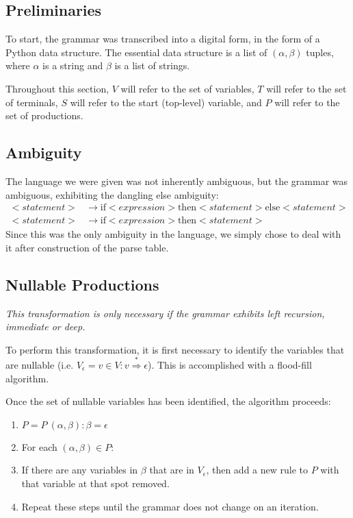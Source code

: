 \documentclass[titlepage]{article}
\newcommand{\deriv}{\overset{*}{\Rightarrow}}
\newcommand{\ep}{\epsilon}
\begin{document}
		\subsection{Preliminaries}
		To start, the grammar was transcribed into a digital form, in the form of a Python data structure. The essential data structure is a list of $(\alpha, \beta)$ tuples, where $\alpha$ is a string and $\beta$ is a list of strings.

		Throughout this section, $V$ will refer to the set of variables, $T$ will refer to the set of terminals, $S$ will refer to the start (top-level) variable, and $P$ will refer to the set of productions.

		\subsection{Ambiguity}
		The language we were given was not inherently ambiguous, but the grammar was ambiguous, exhibiting the dangling else ambiguity:
		\begin{align*}
			<statement> &\rightarrow \textrm{if} <expression> \textrm{then} <statement> \textrm{else} <statement> \\
			<statement> &\rightarrow \textrm{if} <expression> \textrm{then} <statement>
		\end{align*}
		Since this was the only ambiguity in the language, we simply chose to deal with it after construction of the parse table.

		\subsection{Nullable Productions}
		\emph{This transformation is only necessary if the grammar exhibits left recursion, immediate or deep.}

		To perform this transformation, it is first necessary to identify the variables that are nullable (i.e. $V_\ep = {v \in V: v \deriv \ep}$). This is accomplished with a flood-fill algorithm.

		Once the set of nullable variables has been identified, the algorithm proceeds:
		\begin{enumerate}
			\item $P = P \ {(\alpha, \beta) : \beta = \ep}$
			\item For each $(\alpha, \beta) \in P$:
			\item If there are any variables in $\beta$ that are in $V_\ep$, then add a new rule to $P$ with that variable at that spot removed.
			\item Repeat these steps until the grammar does not change on an iteration.
		\end{enumerate}
\end{document}
